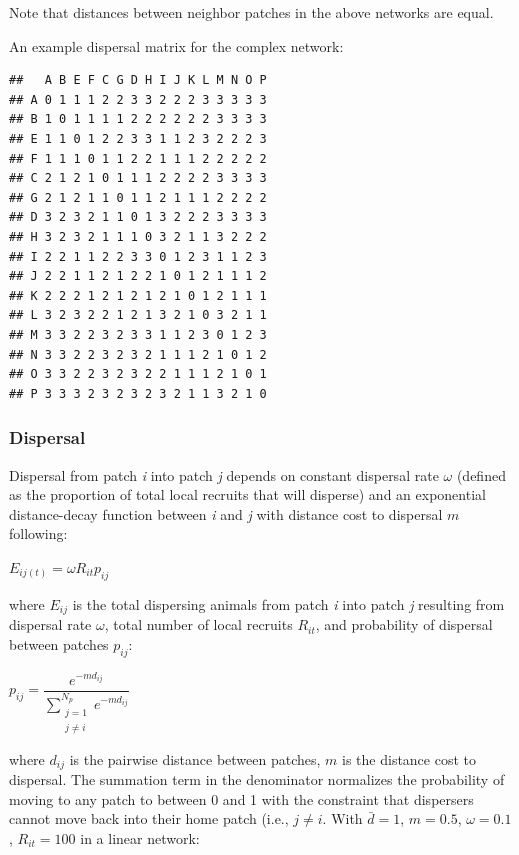 \documentclass[]{article}
\begin{document}
Note that distances between neighbor patches in the above networks are
equal.

An example dispersal matrix for the complex network:

\begin{verbatim}
##   A B E F C G D H I J K L M N O P
## A 0 1 1 1 2 2 3 3 2 2 2 3 3 3 3 3
## B 1 0 1 1 1 1 2 2 2 2 2 2 3 3 3 3
## E 1 1 0 1 2 2 3 3 1 1 2 3 2 2 2 3
## F 1 1 1 0 1 1 2 2 1 1 1 2 2 2 2 2
## C 2 1 2 1 0 1 1 1 2 2 2 2 3 3 3 3
## G 2 1 2 1 1 0 1 1 2 1 1 1 2 2 2 2
## D 3 2 3 2 1 1 0 1 3 2 2 2 3 3 3 3
## H 3 2 3 2 1 1 1 0 3 2 1 1 3 2 2 2
## I 2 2 1 1 2 2 3 3 0 1 2 3 1 1 2 3
## J 2 2 1 1 2 1 2 2 1 0 1 2 1 1 1 2
## K 2 2 2 1 2 1 2 1 2 1 0 1 2 1 1 1
## L 3 2 3 2 2 1 2 1 3 2 1 0 3 2 1 1
## M 3 3 2 2 3 2 3 3 1 1 2 3 0 1 2 3
## N 3 3 2 2 3 2 3 2 1 1 1 2 1 0 1 2
## O 3 3 2 2 3 2 3 2 2 1 1 1 2 1 0 1
## P 3 3 3 2 3 2 3 2 3 2 1 1 3 2 1 0
\end{verbatim}

\hypertarget{dispersal}{%
\subsubsection{Dispersal}\label{dispersal}}

Dispersal from patch \emph{i} into patch \emph{j} depends on constant
dispersal rate \(\omega\) (defined as the proportion of total local
recruits that will disperse) and an exponential distance-decay function
between \emph{i} and \emph{j} with distance cost to dispersal \(m\)
following:

\(E_{ij(t)}=\omega R_{it}p_{ij}\)

where \(E_{ij}\) is the total dispersing animals from patch \emph{i}
into patch \emph{j} resulting from dispersal rate \(\omega\), total
number of local recruits \(R_{it}\), and probability of dispersal
between patches \(p_{ij}\):

\(p_{ij}=\dfrac{e^{-md_{ij}}}{\sum\limits_{\substack{j=1 \\ j\neq i}}^{N_p} e^{-md_{ij}}}\)

where \(d_{ij}\) is the pairwise distance between patches, \(m\) is the
distance cost to dispersal. The summation term in the denominator
normalizes the probability of moving to any patch to between 0 and 1
with the constraint that dispersers cannot move back into their home
patch (i.e., \(j\neq i\). With \(\bar{d}= 1\), \(m=0.5\),
\(\omega=0.1\), \(R_{it}=100\) in a linear network:
\end{document}
